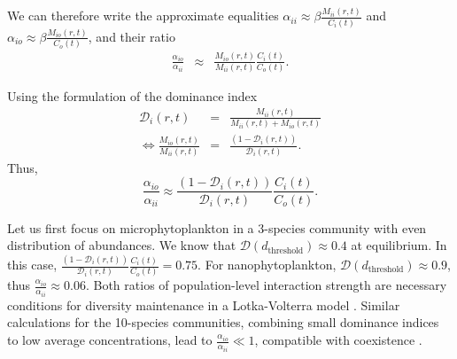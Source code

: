 \documentclass[english]{article}
\begin{document}
We can therefore write the approximate equalities $\alpha_{ii}\approx\beta\frac{M_{ii}(r,t)}{C_{i}(t)}$
and $\alpha_{io}\approx\beta\frac{M_{io}(r,t)}{C_{o}(t)}$, and their
ratio
\begin{equation}
\begin{array}{ccc}
\frac{\alpha_{io}}{\alpha_{ii}} & \approx & \frac{M_{io}(r,t)}{M_{ii}(r,t)}\frac{C_{i}(t)}{C_{o}(t)}.\end{array}
\end{equation}

Using the formulation of the dominance index
\begin{equation}
\begin{array}{ccc}
\mathcal{D}_{i}(r,t) & = & \frac{M_{ii}(r,t)}{M_{ii}(r,t)+M_{io}(r,t)}\\
\Leftrightarrow\frac{M_{io}(r,t)}{M_{ii}(r,t)} & = & \frac{\left(1-\mathcal{D}_{i}(r,t)\right)}{\mathcal{D}_{i}(r,t)}.
\end{array}\label{eq:dominance}
\end{equation}
Thus,
\begin{equation}
\frac{\alpha_{io}}{\alpha_{ii}}\approx\frac{\left(1-\mathcal{D}_{i}(r,t)\right)}{\mathcal{D}_{i}(r,t)}\frac{C_{i}(t)}{C_{o}(t)}.
\end{equation}

Let us first focus on microphytoplankton in a 3-species community
with even distribution of abundances. We know that $\mathcal{D}(d_{\text{threshold}})\approx0.4$
at equilibrium. In this case, $\frac{\left(1-\mathcal{D}_{i}(r,t)\right)}{\mathcal{D}_{i}(r,t)}\frac{C_{i}(t)}{C_{o}(t)}=0.75$.
For nanophytoplankton, $\mathcal{D}(d_{\text{threshold}})\approx0.9$,
thus $\frac{\alpha_{io}}{\alpha_{ii}}\approx0.06$. Both ratios of
population-level interaction strength are necessary conditions for
diversity maintenance in a Lotka-Volterra model . Similar calculations
for the 10-species communities, combining small dominance indices
to low average concentrations, lead to $\frac{\alpha_{io}}{\alpha_{ii}}\ll1$,
compatible with coexistence \citep{barabas_effect_2016}. 



\end{document}
